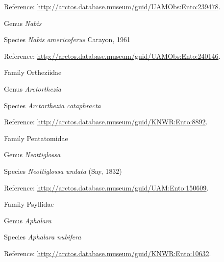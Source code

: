 \documentclass[9pt, article]{memoir}
\begin{document}
\begin{multicols}{2}
Reference: 
\url{http://arctos.database.museum/guid/UAMObs:Ento:239478}.

\vspace{6pt}\noindent\hspace{30pt}Genus \textit{Nabis}


\vspace{6pt}\noindent\hspace{36pt}Species \textit{Nabis americoferus} Carayon, 1961


Reference: 
\url{http://arctos.database.museum/guid/UAMObs:Ento:240146}.

\vspace{6pt}\noindent\hspace{24pt}Family Ortheziidae


\vspace{6pt}\noindent\hspace{30pt}Genus \textit{Arctorthezia}


\vspace{6pt}\noindent\hspace{36pt}Species \textit{Arctorthezia cataphracta}


Reference: 
\url{http://arctos.database.museum/guid/KNWR:Ento:8892}.

\vspace{6pt}\noindent\hspace{24pt}Family Pentatomidae


\vspace{6pt}\noindent\hspace{30pt}Genus \textit{Neottiglossa}


\vspace{6pt}\noindent\hspace{36pt}Species \textit{Neottiglossa undata} (Say, 1832)


Reference: 
\url{http://arctos.database.museum/guid/UAM:Ento:150609}.

\vspace{6pt}\noindent\hspace{24pt}Family Psyllidae


\vspace{6pt}\noindent\hspace{30pt}Genus \textit{Aphalara}


\vspace{6pt}\noindent\hspace{36pt}Species \textit{Aphalara nubifera}


Reference: 
\url{http://arctos.database.museum/guid/KNWR:Ento:10632}.


\end{multicols}
\end{document}
